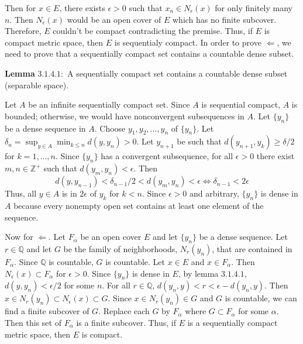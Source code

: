 \begin{exercise}
  Then for \(x\in E\), there exists \(\epsilon > 0\) such that
  \(x_n\in N_{\epsilon}(x)\) for only finitely many \(n\).
  Then \(N_{\epsilon}(x)\) would be an open cover of \(E\) which has no finite
  subcover.
  Therefore, \(E\) couldn't be compact contradicting the premise.
  Thus, if \(E\) is compact metric space, then \(E\) is sequentialy compact.
  In order to prove \(\Leftarrow\), we need to prove that a sequentially
  compact set contains a countable dense subset.
  \par\smallskip
  \textbf{Lemma} \(\mathbold{3.1.4.1:}\) A sequentially compact set contains
  a countable dense subset (separable space).
  \par\smallskip
  Let \(A\) be an infinite sequentially compact set.
  Since \(A\) is sequential compact, \(A\) is bounded; otherwise, we would have
  nonconvergent subsequences in \(A\).
  Let \(\{y_n\}\) be a dense sequence in \(A\).
  Choose \(y_1,y_2,\ldots,y_n\) of \(\{y_n\}\).
  Let \(\delta_n = \sup_{y\in A}\min_{k\leq n}d(y,y_n) > 0\).
  Let \(y_{n + 1}\) be such that \(d(y_{n + 1},y_k)\geq\delta/2\) for
  \(k = 1,\ldots,n\).
  Since \(\{y_n\}\) has a convergent subsequence, for all \(\epsilon > 0\)
  there exist \(m,n\in\mathbb{Z}^+\) such that \(d(y_m,y_n) < \epsilon\).
  Then
  \[
  d(y,y_{n - 1}) < \delta_{n - 1}/2 < d(y_m,y_n) < \epsilon\iff
  \delta_{n - 1} < 2\epsilon
  \]
  Thus, all \(y\in A\) is in \(2\epsilon\) of \(y_k\) for \(k < n\).
  Since \(\epsilon > 0\) and arbitrary, \(\{y_n\}\) is dense in \(A\) because
  every nonempty open set contains at least one element of the sequence.
  \par\smallskip
  Now for \(\Leftarrow\).
  Let \(F_{\alpha}\) be an open cover \(E\) and let \(\{y_n\}\) be a dense
  sequence.
  Let \(r\in\mathbb{Q}\) and let \(G\) be the family of neighborhoods,
  \(N_r(y_n)\), that are contained in \(F_{\alpha}\).
  Since \(\mathbb{Q}\) is countable, \(G\) is countable.
  Let \(x\in E\) and \(x\in F_{\alpha}\).
  Then \(N_{\epsilon}(x)\subset F_{\alpha}\) for \(\epsilon > 0\).
  Since \(\{y_n\}\) is dense in \(E\), by lemma \(3.1.4.1\),
  \(d(y,y_n) < \epsilon/2\) for some \(n\).
  For all \(r\in\mathbb{Q}\), \(d(y_n,y) < r < \epsilon - d(y_n,y)\).
  Then \(x\in N_r(y_n)\subset N_{\epsilon}(x)\subset G\).
  Since \(x\in N_r(y_n)\in G\) and \(G\) is countable, we can find a finite
  subcover of \(G\).
  Replace each \(G\) by \(F_{\alpha}\) where \(G\subset F_{\alpha}\) for some
  \(\alpha\).
  Then this set of \(F_{\alpha}\) is a finite subcover.
  Thus, if \(E\) is a sequentially compact metric space, then \(E\) is compact.

\end{exercise}
